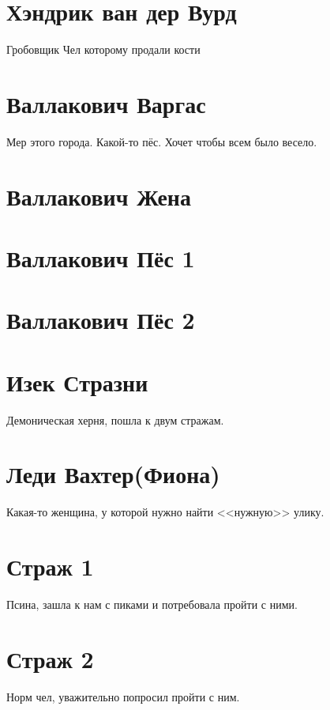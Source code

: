 \documentclass[letterpaper,twocolumn,openany,nodeprecatedcode]{dndbook}
\begin{document}
\section{Хэндрик ван дер Вурд}
Гробовщик 
Чел которому продали кости

\section{Валлакович Варгас}
Мер этого города. Какой-то пёс. Хочет чтобы всем было весело.

\section{Валлакович Жена}

\section{Валлакович Пёс 1}

\section{Валлакович Пёс 2}

\section{Изек Стразни}

Демоническая херня, пошла к двум стражам.

\section{Леди Вахтер(Фиона)}

Какая-то женщина, у которой нужно найти <<нужную>> улику. 





\section{Страж 1}

Псина, зашла к нам с пиками и потребовала пройти с ними.

\section{Страж 2}

Норм чел, уважительно попросил пройти с ним.
\end{document}

